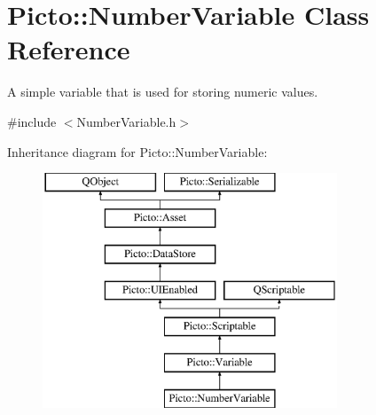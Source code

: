 \hypertarget{class_picto_1_1_number_variable}{\section{Picto\-:\-:Number\-Variable Class Reference}
\label{class_picto_1_1_number_variable}
}


A simple variable that is used for storing numeric values.  




{\ttfamily \#include $<$Number\-Variable.\-h$>$}

Inheritance diagram for Picto\-:\-:Number\-Variable\-:\begin{figure}[H]
\begin{center}
\leavevmode
\includegraphics[height=7.000000cm]{class_picto_1_1_number_variable}
\end{center}
\end{figure}
